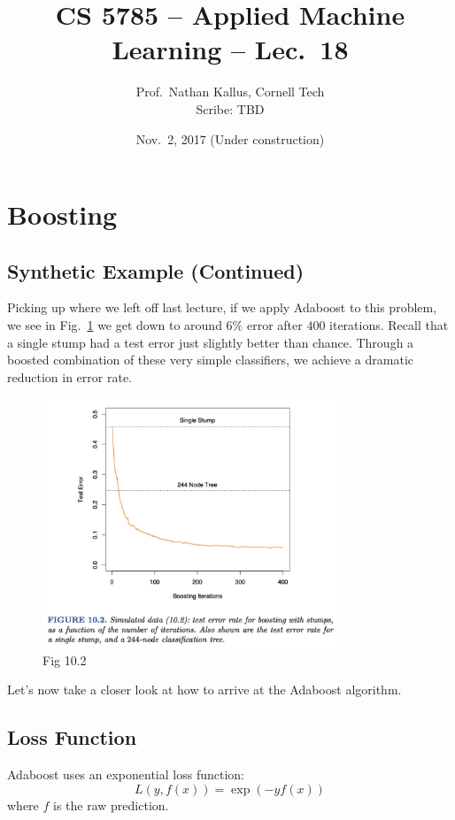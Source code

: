 \documentclass[a4paper]{article}
\title{CS 5785 -- Applied Machine Learning -- Lec.\ 18}
\author{Prof.\ Nathan Kallus, Cornell Tech\\Scribe: TBD}
\date{Nov.\ 2, 2017 (Under construction)}
\begin{document}
\maketitle



\section{Boosting}

\subsection{Synthetic Example (Continued)}
Picking up where we left off last lecture, if we apply Adaboost to this problem, we see in Fig.~\ref{fig:boost} we get down to around $6\%$ error after $400$ iterations.  Recall that a single stump had a test error just slightly better than chance.  Through a boosted combination of these very simple classifiers, we achieve a dramatic reduction in error rate.

\begin{figure}
\centering
\includegraphics[width=0.8\textwidth]{fig10_2.png}
\caption{\label{fig:boost}Fig 10.2}
\end{figure}

Let's now take a closer look at how to arrive at the Adaboost algorithm.

\subsection{Loss Function}
Adaboost uses an exponential loss function:
$$
L\left( y, f(x) \right) = \exp\left( -yf(x) \right)
$$
where $f$ is the raw prediction.
\end{document}
